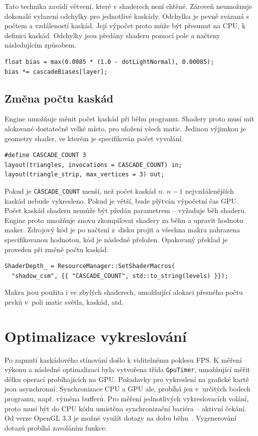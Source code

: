 \documentclass[thesis=M,czech]{FITthesis}[2019/12/23]
\begin{document}
Tato technika zavádí větvení, které v shaderech není chtěné. Zároveň neumožnuje dokonalé vylazení odchylky pro jednotlivé kaskády. Odchylka je pevně svázaná s počtem a vzdáleností kaskád. Její výpočet proto může být přesunut na CPU, k definici kaskád. Odchylky jsou předány shaderu pomocí pole a načteny následujícím způsobem.

\begin{verbatim}
float bias = max(0.0085 * (1.0 - dotLightNormal), 0.00085);
bias *= cascadeBiases[layer];
\end{verbatim}

\subsection{Změna počtu kaskád}

Engine umožňuje měnit počet kaskád při běhu programu. Shadery proto musí mít alokované dostatečně velké místo, pro uložení všech matic. Jedinou výjimkou je geometry shader, ve kterém je specifikován počet vyvolání.

\begin{verbatim}
#define CASCADE_COUNT 3
layout(triangles, invocations = CASCADE_COUNT) in;
layout(triangle_strip, max_vertices = 3) out;
\end{verbatim}

Pokud je \texttt{CASCADE\_COUNT} menší, než počet kaskád $n$. $n - 1$ nejvzdálenějších kaskád nebude vykresleno. Pokud je větší, bude plýtván výpočetní čas GPU. Počet kaskád shaderu nemůže být předán parametrem -- vyžaduje běh shaderu. Engine proto umožňuje znovu zkompilovat shadery za běhu a upravit hodnotu maker. Zdrojový kód je po načtení z~disku projit a všechna makra nahrazena specifikovanou hodnotou, kód je následně přeložen. Opakovaný překlad je proveden při změně počtu kaskád.

\begin{verbatim}
ShaderDepth_ = ResourceManager::SetShaderMacros(
  "shadow_csm", {{ "CASCADE_COUNT", std::to_string(levels) }});
\end{verbatim}

Makra jsou použita i ve zbylých shaderech, umožňující alokaci přesného počtu prvků v~poli matic světla, kaskád, atd.

\section{Optimalizace vykreslování}

Po zapnutí kaskádového stínování došlo k viditelnému poklesu FPS. K měření výkonu a následné optimalizaci byla vytvořena třída \texttt{GpuTimer}, umožňující měřit délku operací probíhajících na GPU. Požadavky pro vykreslení na grafické kartě jsou asynchronní. Synchronizace CPU a GPU ale, probíhá jen v~určitých bodech programu, např. výměna bufferů. Pro měření jednotlivých vykreslovacích volání, proto musí být do CPU kódu umístěna synchronizační bariéra -- aktivní čekání. Od verze OpenGL 3.3 je možné využít dotazy na dobu běhu~\cite{timer}. Vygenerování dotazů probíhá zavoláním funkce: 
\end{document}

